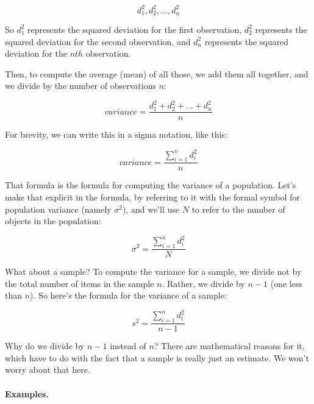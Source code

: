 \documentclass[../../../main.tex]{subfiles}
\begin{document}
\begin{equation*}
  d^{2}_{1}, d^{2}_{2}, \ldots, d^{2}_{n}
\end{equation*}

\noindent
So $d^{2}_{1}$ represents the squared deviation for the first observation, $d^{2}_{2}$ represents the squared deviation for the second observation, and $d^{2}_{n}$ represents the squared deviation for the $nth$ observation.

Then, to compute the average (mean) of all those, we add them all together, and we divide by the number of observations $n$:

\begin{equation*}
  variance = \frac{d^{2}_{1} + d^{2}_{2} + \ldots + d^{2}_{n}}{n}
\end{equation*}

\noindent
For brevity, we can write this in a sigma notation, like this:

\begin{equation*}
  variance = \frac{\sum\limits_{i=1}^{n} d^{2}_{i} }{n}
\end{equation*}

\noindent
That formula is the formula for computing the variance of a population. Let's make that explicit in the formula, by referring to it with the formal symbol for population variance (namely $\sigma^{2}$), and we'll use $N$ to refer to the number of objects in the population:

\begin{equation*}
  \sigma^{2} = \frac{\sum\limits_{i=1}^{n} d^{2}_{i} }{N}
\end{equation*}

\noindent
What about a sample? To compute the variance for a sample, we divide not by the total number of items in the sample $n$. Rather, we divide by $n - 1$ (one less than $n$). So here's the formula for the variance of a sample:

\begin{equation*}
  s^{2} = \frac{\sum\limits_{i=1}^{n} d^{2}_{i} }{n - 1}
\end{equation*}

\noindent
Why do we divide by $n - 1$ instead of $n$? There are mathematical reasons for it, which have to do with the fact that a sample is really just an estimate. We won't worry about that here.


\paragraph{Examples.}
\end{document}
